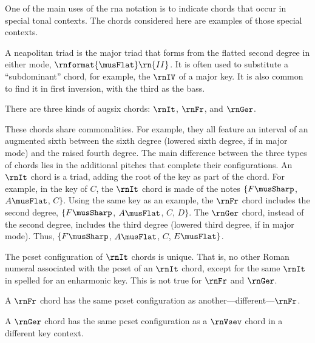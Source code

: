 
One of the main uses of the \gls{rna} notation is to
indicate chords that occur in special tonal contexts. The
chords considered here are examples of those special
contexts.


A \gls{neapolitan} triad is the major triad that forms from
the flatted second degree in either mode,
$\rnformat{\musFlat}\rn{II}$. It is often used to substitute
a ``subdominant'' chord, for example, the $\rnIV$ of a major
key. It is also common to find it in first inversion, with
the third as the bass.


There are three kinds of \gls{augsix} chords: $\rnIt$,
$\rnFr$, and $\rnGer$.

These chords share commonalities. For example, they all
feature an interval of an augmented sixth between the sixth
degree (lowered sixth degree, if in major mode) and the
raised fourth degree. The main difference between the three
types of chords lies in the additional pitches that complete
their configurations. An $\rnIt$ chord is a triad, adding
the root of the key as part of the chord. For example, in
the key of $C$, the $\rnIt$ chord is made of the notes
$\{F\musSharp$, $A\musFlat$, $C\}$. Using the same key as an
example, the $\rnFr$ chord includes the second degree,
$\{F\musSharp$, $A\musFlat$, $C$, $D\}$. The $\rnGer$ chord,
instead of the second degree, includes the third degree
(lowered third degree, if in major mode). Thus,
$\{F\musSharp$, $A\musFlat$, $C$, $E\musFlat\}$.

The \gls{pcset} configuration of $\rnIt$ chords is unique.
That is, no other Roman numeral associated with the
\gls{pcset} of an $\rnIt$ chord, except for the same $\rnIt$
in spelled for an enharmonic key. This is not true for
$\rnFr$ and $\rnGer$. 

A $\rnFr$ chord has the same \gls{pcset} configuration as
another---different---$\rnFr$.

A $\rnGer$ chord has the same \gls{pcset} configuration as a
$\rnVsev$ chord in a different key context.
